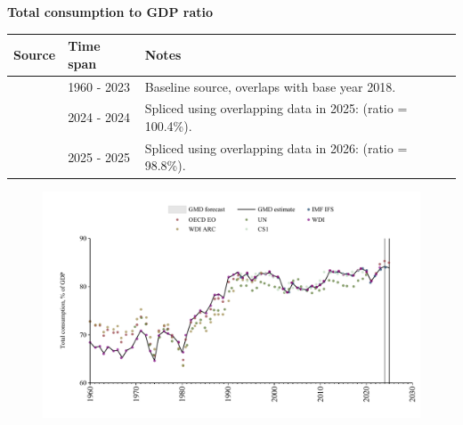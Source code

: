 \documentclass[12pt,a4paper,landscape]{article}
\begin{document}
\begin{adjustbox}{max totalsize={\paperwidth}{\paperheight},center}
\begin{minipage}[t][\textheight][t]{\textwidth}
\vspace*{0.5cm}
{}
\begin{center}
{\Large\bfseries Total consumption to GDP ratio}
\end{center}
\vspace{0.5cm}
\begin{table}[H]
\centering
\small
\begin{tabular}{|l|l|l|}
\hline
\textbf{Source} & \textbf{Time span} & \textbf{Notes} \\
\hline
\rowcolor{white}\cite{WDI}& 1960 - 2023 &Baseline source, overlaps with base year 2018. \\
\rowcolor{lightgray}\cite{IMF_IFS}& 2024 - 2024 &Spliced using overlapping data in 2025: (ratio = 100.4\%). \\
\rowcolor{white}\cite{OECD_EO}& 2025 - 2025 &Spliced using overlapping data in 2026: (ratio = 98.8\%). \\
\hline
\end{tabular}
\end{table}
\begin{figure}[H]
\centering
\includegraphics[width=\textwidth,height=0.6\textheight,keepaspectratio]{graphs/ZAF_cons_GDP.pdf}
\end{figure}
\end{minipage}
\end{adjustbox}
\end{document}

